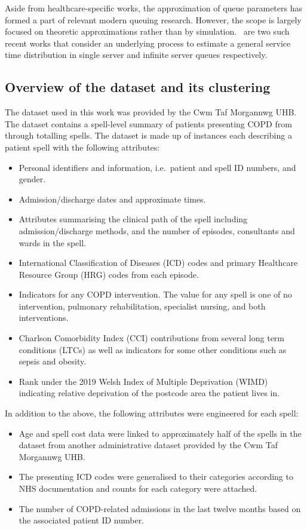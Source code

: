 Aside from healthcare-specific works, the approximation of
queue parameters has formed a part of relevant modern queuing research. However,
the scope is largely focused on theoretic approximations rather than by
simulation.~\cite{Djabali2018,Goldenshluger2016} are two such recent
works that consider an underlying process to estimate a general service time
distribution in single server and infinite server queues respectively.

\subsection{Overview of the dataset and its clustering}\label{subsec:overview}

The dataset used in this work was provided by the Cwm Taf Morgannwg UHB. The dataset contains a
spell-level summary of patients presenting COPD from
through totalling
spells. The dataset is made up of instances each describing a
patient spell with the following attributes:
\begin{itemize}
    \item Personal identifiers and information, i.e.\ patient and spell ID
        numbers, and gender.
    \item Admission/discharge dates and approximate times.
    \item Attributes summarising the clinical path of the spell including
        admission/discharge methods, and the number of episodes, consultants and
        wards in the spell.
    \item International Classification of Diseases (ICD) codes and primary
        Healthcare Resource Group (HRG) codes from each episode.
    \item Indicators for any COPD intervention. The value for any spell is one
        of no intervention, pulmonary rehabilitation, specialist nursing, and
        both interventions.
    \item Charlson Comorbidity Index (CCI) contributions from several long term
        conditions (LTCs) as well as indicators for some other conditions such
        as sepsis and obesity.
    \item Rank under the 2019 Welsh Index of Multiple Deprivation (WIMD)
        indicating relative deprivation of the postcode area the patient lives
        in.
\end{itemize}

In addition to the above, the following attributes were engineered for each
spell:
\begin{itemize}
    \item Age and spell cost data were linked to approximately half of the
        spells in the dataset from another administrative dataset provided by
        the Cwm Taf Morgannwg UHB.\
    \item The presenting ICD codes were generalised to their categories
        according to NHS documentation and counts for each category were
        attached.
    \item The number of COPD-related admissions in the last twelve months based
        on the associated patient ID number.
\end{itemize}

